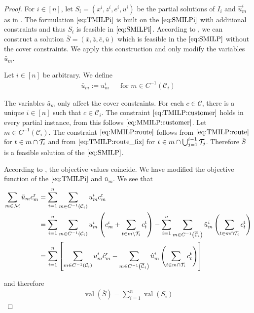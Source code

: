 \begin{proof}

For ${i\in[n]}$, let ${S_i=\left(x^i,z^i,e^i,u^i\right)}$ be the partial solutions of $I_i$ and $\hat{u}^i_m$ as in . The formulation $\eqref{eq:TMILPi}$ is built on the $\eqref{eq:SMILPi}$ with additional constraints and thus $S_i$ is feasible in $\eqref{eq:SMILPi}$. According to , we can construct a solution ${\overline{S}=\left(\bar{x},\bar{z},\bar{e},\bar{u}\right)}$ which is feasible in the $\eqref{eq:SMILP}$ without the cover constraints. We apply this construction and only modify the variables $\bar{u}_m$.

Let ${i\in[n]}$ be arbitrary. We define
\begin{align*}
	\bar{u}_m := u^i_m && \text{for } m\in C^{-1}\left(\mathcal{C}_i\right)
\end{align*}

The variables $\bar{u}_m$ only affect the cover constraints. For each ${c\in\mathcal{C}}$, there is a unique ${i\in[n]}$ such that ${c\in\mathcal{C}_i}$. The constraint $\eqref{eq:TMILP:customer}$ holds in every partial instance, from this follows $\eqref{eq:MMILP:customer}$. Let ${m\in C^{-1}\left(\mathcal{C}_i\right)}$. The constraint $\eqref{eq:MMILP:route}$ follows from $\eqref{eq:TMILP:route}$ for ${t\in m\cap\mathcal{T}_i}$ and from $\eqref{eq:TMILP:route_fix}$ for ${t\in m\cap\bigcup_{j=1}^{i-1}\mathcal{T}_j}$. Therefore $\overline{S}$ is a feasible solution of the $\eqref{eq:SMILP}$.

According to , the objective values coincide. We have modified the objective function of the $\eqref{eq:TMILPi}$ and $\bar{u}_m$. We see that
\begin{align*}
	\sum_{m\in\mathcal{M}} \bar{u}_m c^{\operatorname{r}}_m & = \sum_{i=1}^n \sum_{m\in C^{-1}\left(\mathcal{C}_i\right)} u^i_m c^{\operatorname{r}}_m \\
	& = \sum_{i=1}^n \sum_{m\in C^{-1}\left(\mathcal{C}_i\right)} u^i_m\left(c^{\operatorname{r}}_m + \sum_{t\in m\backslash\mathcal{T}_i} c^{\operatorname{t}}_t\right) - \sum_{i=1}^n \sum_{m\in C^{-1}\left(\overline{\mathcal{C}}_i\right)} \hat{u}^i_m\left(\sum_{t\in m\cap\mathcal{T}_i} c^{\operatorname{t}}_t\right) \\
	& = \sum_{i=1}^n \left[\sum_{m\in C^{-1}\left(\mathcal{C}_i\right)} u^i_m \hat{c}^{\operatorname{r}}_m - \sum_{m\in C^{-1}\left(\overline{\mathcal{C}}_i\right)} \hat{u}^i_m \left(\sum_{t\in m\cap\mathcal{T}_i} c^{\operatorname{t}}_t\right)\right]
\end{align*}

and therefore
\begin{align*}
	\operatorname{val}\left(\overline{S}\right) = \sum_{i=1}^n \operatorname{val}\left(S_i\right)
\end{align*}

\end{proof}

